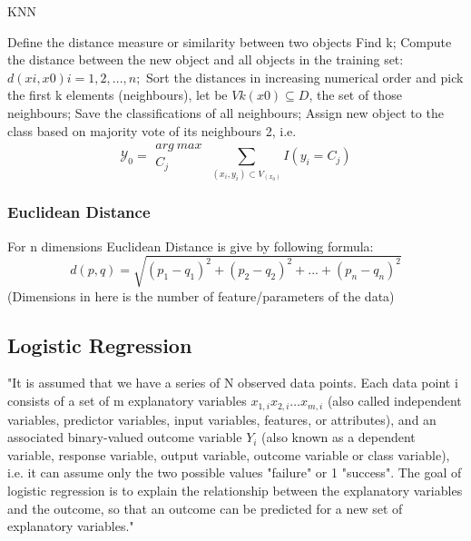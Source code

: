 \documentclass[twoside]{article}
\begin{document}
\begin{multicols}{2}
\begin{algorithm*}[t]
\caption{KNN} %
\label{alg:KNN}
\begin{algorithmic} [1]
    \State Define the distance measure or similarity between two objects \label{1}
    \State Find k; \label{KNN-fnd-k}
    \State Compute the distance between the new object and all objects in the training set: $d(xi, x0) i = 1, 2, . . . , n;$
	\State Sort the distances in increasing numerical order and pick the first k elements (neighbours), let be $Vk (x0) \subseteq D$, the set of those neighbours;
    \State Save the classifications of all neighbours;
    \State Assign new object to the class based on majority vote of its
neighbours 2, i.e.	\[	\mathcal{Y}_0 = \substack{arg\ max\ \\ C_j} \sum_{(x_i,y_i)\subset V_(x_0)} I(y_i=C_j) \]
\end{algorithmic}
\end{algorithm*}
\subsubsection*{Euclidean Distance}
For n dimensions Euclidean Distance is give by following formula:
\[ d(p,q)= \sqrt{(p_1 - q_1)^2 + (p_2 - q_2)^2 + ... + (p_n - q_n)^2} \]
(Dimensions in here is the number of feature/parameters of the data)

\subsection*{Logistic Regression}
\indent \par
"It is assumed that we have a series of N observed data points. Each data point i consists of a set of m explanatory variables $x_{1,i} x_{2,i} \dots x_{m,i}$ (also called independent variables, predictor variables, input variables, features, or attributes), and an associated binary-valued outcome variable $Y_i$ (also known as a dependent variable, response variable, output variable, outcome variable or class variable), i.e. it can assume only the two possible values "failure" or 1 "success". The goal of logistic regression is to explain the relationship between the explanatory variables and the outcome, so that an outcome can be predicted for a new set of explanatory variables."




\end{multicols}
\end{document}
